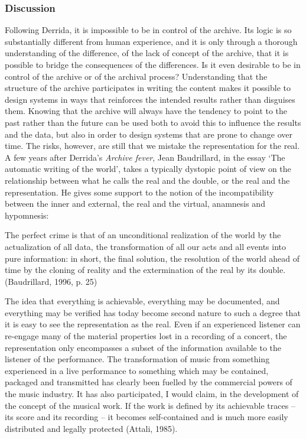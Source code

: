 \hypertarget{discussion}{%
\subsubsection{Discussion}\label{discussion}}

Following Derrida, it is impossible to be in control of the archive. Its
logic is so substantially different from human experience, and it is
only through a thorough understanding of the difference, of the lack of
concept of the archive, that it is possible to bridge the consequences
of the differences. Is it even desirable to be in control of the archive
or of the archival process? Understanding that the structure of the
archive participates in writing the content makes it possible to design
systems in ways that reinforces the intended results rather than
disguises them. Knowing that the archive will always have the tendency
to point to the past rather than the future can be used both to avoid
this to influence the results and the data, but also in order to design
systems that are prone to change over time. The risks, however, are
still that we mistake the representation for the real. A few years after
Derrida's \emph{Archive fever}, Jean Baudrillard, in the essay `The
automatic writing of the world', takes a typically dystopic point of
view on the relationship between what he calls the real and the double,
or the real and the representation. He gives some support to the notion
of the incompatibility between the inner and external, the real and the
virtual, anamnesis and hypomnesis:

The perfect crime is that of an unconditional realization of the world
by the actualization of all data, the transformation of all our acts and
all events into pure information: in short, the final solution, the
resolution of the world ahead of time by the cloning of reality and the
extermination of the real by its double. (Baudrillard, 1996, p. 25)

The idea that everything is achievable, everything may be documented,
and everything may be verified has today become second nature to such a
degree that it is easy to see the representation as the real. Even if an
experienced listener can re-engage many of the material properties lost
in a recording of a concert, the representation only encompasses a
subset of the information available to the listener of the performance.
The transformation of music from something experienced in a live
performance to something which may be contained, packaged and
transmitted has clearly been fuelled by the commercial powers of the
music industry. It has also participated, I would claim, in the
development of the concept of the musical work. If the work is defined
by its achievable traces -- its score and its recording -- it becomes
self-contained and is much more easily distributed and legally protected
(Attali, 1985).

